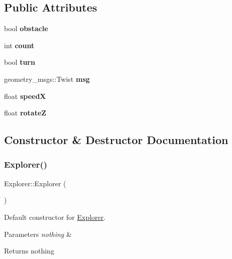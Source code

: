 \subsection*{Public Attributes}
\begin{DoxyCompactItemize}
\item 
\mbox{\label{classExplorer_aae77ad5be0e6da499ea662ca7bbd1d42}} 
bool {\bfseries obstacle}
\item 
\mbox{\label{classExplorer_a75d3cae2e1bb7b4c3eb53864c767f9f6}} 
int {\bfseries count}
\item 
\mbox{\label{classExplorer_a8b2d390a6cd5d0092e702ee0c4b2e641}} 
bool {\bfseries turn}
\item 
\mbox{\label{classExplorer_a151ed0ca8767509781f213609bc98104}} 
geometry\+\_\+msgs\+::\+Twist {\bfseries msg}
\item 
\mbox{\label{classExplorer_a445354c7b8533f3f494fbcd68093827a}} 
float {\bfseries speedX}
\item 
\mbox{\label{classExplorer_a7aa684836abdd7d037a33fe67e7aa81c}} 
float {\bfseries rotateZ}
\end{DoxyCompactItemize}


\subsection{Constructor \& Destructor Documentation}
\mbox{\label{classExplorer_acbedef0262785b6983d1fe9b4f2c6242}} 
\subsubsection{\texorpdfstring{Explorer()}{Explorer()}}
{\footnotesize\ttfamily Explorer\+::\+Explorer (\begin{DoxyParamCaption}{ }\end{DoxyParamCaption})}



Default constructor for \mbox{\hyperlink{classExplorer}{Explorer}}. 


\begin{DoxyParams}{Parameters}
{\em nothing} & \\
\hline
\end{DoxyParams}
\begin{DoxyReturn}{Returns}
nothing 
\end{DoxyReturn}
\mbox{\label{classExplorer_aa1b0a71e92e003e9162a5ba99d843392}} 
